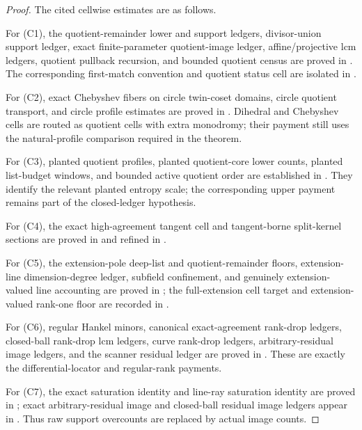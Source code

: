 \documentclass[11pt,a4paper]{amsart}
\numberwithin{equation}{section}
\theoremstyle{remark}
\begin{document}
\begin{proof}
The cited cellwise estimates are as follows.

For \textup{(C1)}, the quotient-remainder lower and support ledgers, divisor-union support ledger, exact finite-parameter quotient-image ledger, affine/projective lcm ledgers, quotient pullback recursion, and bounded quotient census are proved in \cite[quotient-remainder, quotient support, quotient-image, and bounded-census ledgers]{Cho26CapV13}.  The corresponding first-match convention and quotient status cell are isolated in \cite{Cho26Grande}.

For \textup{(C2)}, exact Chebyshev fibers on circle twin-coset domains,
circle quotient transport, and circle profile estimates are proved in
\cite[Chebyshev and circle sections]{Cho26CapV13}.  Dihedral and Chebyshev
cells are routed as quotient cells with extra monodromy; their payment still
uses the natural-profile comparison required in the theorem.

For \textup{(C3)}, planted quotient profiles, planted quotient-core lower
counts, planted list-budget windows, and bounded active quotient order are
established in \cite[planted quotient profile and bounded quotient
census]{Cho26CapV13}.  They identify the relevant planted entropy scale;
the corresponding upper payment remains part of the closed-ledger
hypothesis.

For \textup{(C4)}, the exact high-agreement tangent cell and tangent-borne split-kernel sections are proved in \cite[high-agreement tangent exact cell and split-kernel tangent-borne theorem]{Cho26CapV13} and refined in \cite[exact high-agreement tangent cell]{Cho26Grande}.

For \textup{(C5)}, the extension-pole deep-list and quotient-remainder floors, extension-line dimension-degree ledger, subfield confinement, and genuinely extension-valued line accounting are proved in \cite[extension-pole and extension-line ledgers]{Cho26CapV13}; the full-extension cell target and extension-valued rank-one floor are recorded in \cite{Cho26Grande}.

For \textup{(C6)}, regular Hankel minors, canonical exact-agreement rank-drop ledgers, closed-ball rank-drop lcm ledgers, curve rank-drop ledgers, arbitrary-residual image ledgers, and the scanner residual ledger are proved in \cite[Hankel, rank-drop, curve, residual-image, and scanner ledgers]{Cho26CapV13}.  These are exactly the differential-locator and regular-rank payments.

For \textup{(C7)}, the exact saturation identity and line-ray saturation identity are proved in \cite[saturation and line-ray saturation identities]{Cho26Grande}; exact arbitrary-residual image and closed-ball residual image ledgers appear in \cite[residual image ledgers]{Cho26CapV13}.  Thus raw support overcounts are replaced by actual image counts.


\end{proof}
\end{document}

